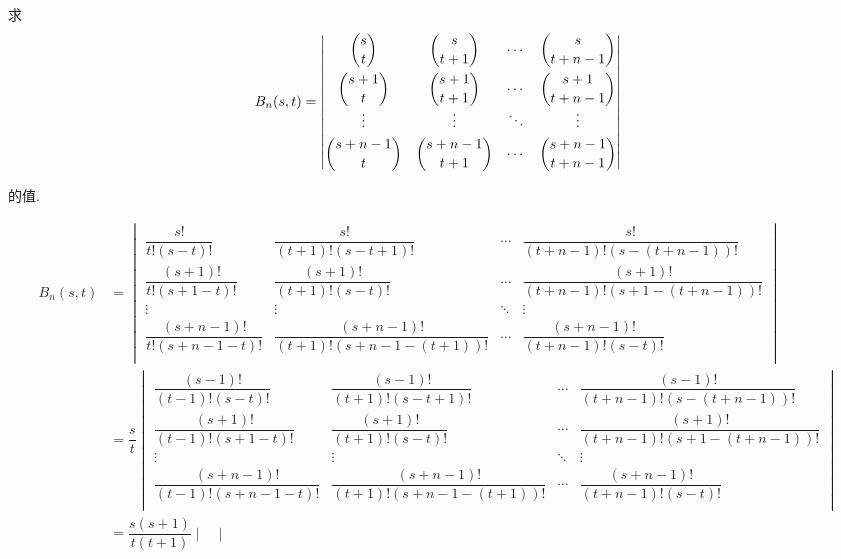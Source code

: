 \documentclass{ctexart}
\begin{document}
\begin{exercise}%
    求
    \[B_n(s,t)=\begin{vmatrix}
        \dbinom{s}{t} & \dbinom{s}{t+1} & \cdots & \dbinom{s}{t+n-1} \\[10pt]
        \dbinom{s+1}{t} & \dbinom{s+1}{t+1} & \cdots & \dbinom{s+1}{t+n-1} \\
        \vdots & \vdots & \ddots & \vdots \\[4pt]
        \dbinom{s+n-1}{t} & \dbinom{s+n-1}{t+1} & \cdots & \dbinom{s+n-1}{t+n-1} \\
    \end{vmatrix}\]

    的值.
\end{exercise}
\begin{solution}
    \begin{landscape}
        \begin{align*}
            B_n(s,t) & =\begin{vmatrix}
                \dfrac{s!}{t!(s-t)!} & \dfrac{s!}{(t+1)!(s-t+1)!} & \cdots & \dfrac{s!}{(t+n-1)!(s-(t+n-1))!} \\[10pt]
                \dfrac{(s+1)!}{t!(s+1-t)!} & \dfrac{(s+1)!}{(t+1)!(s-t)!} & \cdots & \dfrac{(s+1)!}{(t+n-1)!(s+1-(t+n-1))!} \\
                \vdots & \vdots & \ddots & \vdots \\[4pt]
                \dfrac{(s+n-1)!}{t!(s+n-1-t)!} & \dfrac{(s+n-1)!}{(t+1)!(s+n-1-(t+1))!} & \cdots & \dfrac{(s+n-1)!}{(t+n-1)!(s-t)!} \\
            \end{vmatrix} \\
            & =\dfrac{s}{t}\begin{vmatrix}
                \dfrac{(s-1)!}{(t-1)!(s-t)!} & \dfrac{(s-1)!}{(t+1)!(s-t+1)!} & \cdots & \dfrac{(s-1)!}{(t+n-1)!(s-(t+n-1))!} \\[10pt]
                \dfrac{(s+1)!}{(t-1)!(s+1-t)!} & \dfrac{(s+1)!}{(t+1)!(s-t)!} & \cdots & \dfrac{(s+1)!}{(t+n-1)!(s+1-(t+n-1))!} \\
                \vdots & \vdots & \ddots & \vdots \\[4pt]
                \dfrac{(s+n-1)!}{(t-1)!(s+n-1-t)!} & \dfrac{(s+n-1)!}{(t+1)!(s+n-1-(t+1))!} & \cdots & \dfrac{(s+n-1)!}{(t+n-1)!(s-t)!} \\
            \end{vmatrix} \\
            & =\dfrac{s(s+1)}{t(t+1)}\begin{vmatrix}

\end{vmatrix}
\end{align*}
\end{landscape}
\end{solution}
\end{document}
